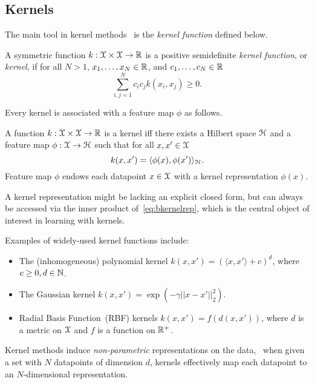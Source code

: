 \subsection{Kernels}
\label{subsec:b-kernels}

The main tool in kernel methods~\citep{scholkopf02} is the \emph{kernel function} defined below.
\begin{ndefn} \label{def:bkernelfun}
	A symmetric function $k: \mathcal{X} \times \mathcal{X} \rightarrow \mathbb{R} $ is a positive semidefinite \emph{kernel function}, or \emph{kernel}, if for all $N>1$, $x_1, \ldots, x_N \in \mathbb{R}$, and $c_1, \ldots, c_N \in \mathbb{R}$ 
	\[
	\sum_{i,j=1}^{N} c_ic_j k(x_i, x_j) \geq 0.
	\]
\end{ndefn}

Every kernel is associated with a feature map $\phi$ as follows.

\begin{ndefn} \label{def:bkernelrepr}
	 A function $k: \mathcal{X} \times \mathcal{X} \rightarrow \mathbb{R}$ is a kernel iff there exists a Hilbert space $\mathcal{H}$ and a feature map $\phi: \mathcal{X} \rightarrow \mathcal{H}$ such that for all $x, x' \in \mathcal{X}$
	 \[
	 \label{eq:bkernelrep}
	 k(x,x') = \langle \phi(x), \phi(x') \rangle_{\mathcal{H}}.
	 \]
	 Feature map $\phi$ endows each datapoint $x \in \mathcal{X}$ with a kernel representation $\phi(x)$.
\end{ndefn}
A kernel representation might be lacking an explicit closed form, but can always be accessed via the inner product of~\cref{eq:bkernelrep}, which is the central object of interest in learning with kernels.

Examples of widely-used kernel functions include:
\begin{itemize}
	\item The (inhomogeneous) polynomial kernel $k(x,x') = \left(\langle x, x'\rangle + c\right)^d$, where $ {c \geq 0}, {d \in \mathbb{N}}$.
	\item The Gaussian kernel $k(x,x') = \exp(-\gamma||x-x'||_{2}^2)$.
	\item Radial Basis Function~(RBF) kernels $k(x,x') = f(d(x,x'))$, where $d$ is a metric on $\mathcal{X}$ and $f$ is a function on $\mathbb{R}^{+}$.
\end{itemize}

Kernel methods induce \emph{non-parametric} representations on the data, \ie~when given a set with $ N $ datapoints of dimension $d$, kernels effectively map each datapoint to an $N$-dimensional representation. %

